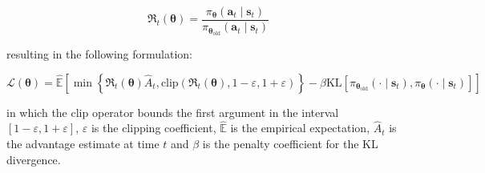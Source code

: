 \begin{equation}
    \mathfrak{R} _t (\boldsymbol{\theta}) = \frac{\pi_{\boldsymbol{\theta}} (\mathbf{a}_t \mid \mathbf{s}_t)}{\pi _{\boldsymbol{\theta}_{\text{old}}} (\mathbf{a}_t \mid \mathbf{s}_t)}
\end{equation}

resulting in the following formulation:

\begin{equation}
    \mathcal{L} (\boldsymbol{\theta}) = \hat{\mathbb{E}} \left[\min \left\{ \mathfrak{R}_t(\boldsymbol{\theta}) \hat{A}_t, \text{clip}\left(\mathfrak{R}_t(\boldsymbol{\theta}) , 1- \varepsilon, 1+\varepsilon \right)  \right\} - \beta \mathrm{KL} [\pi_{\boldsymbol{\theta}_{\text{old}}} (\cdot \mid \mathbf{s}_t), \pi_{\boldsymbol{\theta}} (\cdot \mid \mathbf{s}_t) ] \right]
\end{equation}

in which the $\text{clip}$ operator bounds the first argument in the interval $[1-\varepsilon, 1+\varepsilon]$, $\varepsilon$ is the clipping coefficient, $\hat{\mathbb{E}}$ is the empirical expectation, $\hat{A}_t$ is the advantage estimate at time $t$ and $\beta$ is the penalty coefficient for the KL divergence.




